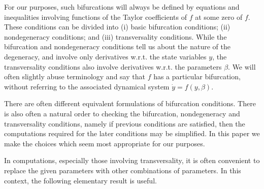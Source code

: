 \documentclass[11pt]{amsart}
\theoremstyle{definition}
\begin{document}
For our purposes, such bifurcations will always be defined by equations and inequalities involving functions of the Taylor coefficients of $f$ at some zero of $f$. These conditions can be divided into (i) basic bifurcation conditions; (ii) nondegeneracy conditions; and (iii) transversality conditions. While the bifurcation and nondegeneracy conditions tell us about the nature of the degeneracy, and involve only derivatives w.r.t. the state variables $y$, the transversality conditions also involve derivatives w.r.t. the parameters $\beta$. We will often slightly abuse terminology and say that $f$ has a particular bifurcation, without referring to the associated dynamical system $\dot y = f(y,\beta)$. 

There are often different equivalent formulations of bifurcation conditions. There is also often a natural order to checking the bifurcation, nondegeneracy and transversality conditions, namely if previous conditions are satisfied, then the computations required for the later conditions may be simplified. In this paper we make the choices which seem most appropriate for our purposes. 

In computations, especially those involving transversality, it is often convenient to replace the given parameters with other combinations of parameters. In this context, the following elementary result is useful.
\end{document}
